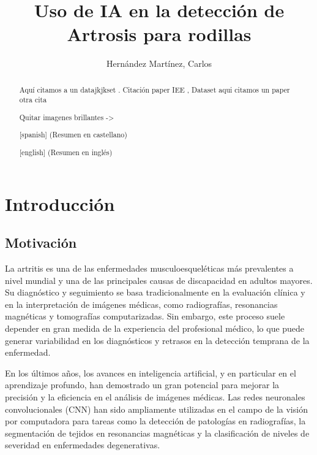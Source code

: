 \documentclass[11pt,spanish,listoffigures,listoftables]{tfgetsinf}
\title{Uso de IA en la detección de Artrosis para rodillas}
\author{Hernández Martínez, Carlos}
\begin{document}

\begin{abstract}
Aquí citamos a un datajkjkset \cite{gornale2020digital}.
Citación paper IEE \cite{10863523}, Dataset \cite{chen2018knee}
aqui citamos un paper \cite{VAATTOVAARA2025100580}
otra cita \cite{comprehensive_review}

Quitar imagenes brillantes -> \cite{efficientnet_paper}
\end{abstract}

\begin{abstract}[spanish]
(Resumen en castellano)
\end{abstract}

\begin{abstract}[english]
(Resumen en inglés)
\end{abstract}

\mainmatter


\chapter{Introducción}  %

\section{Motivación}     %
La artritis es una de las enfermedades musculoesqueléticas más prevalentes a nivel mundial y una de las principales causas de discapacidad en adultos mayores. Su diagnóstico y seguimiento se basa tradicionalmente en la evaluación clínica y en la interpretación de imágenes médicas, como radiografías, resonancias magnéticas y tomografías computarizadas. Sin embargo, este proceso suele depender en gran medida de la experiencia del profesional médico, lo que puede generar variabilidad en los diagnósticos y retrasos en la detección temprana de la enfermedad.

En los últimos años, los avances en inteligencia artificial, y en particular en el aprendizaje profundo, han demostrado un gran potencial para mejorar la precisión y la eficiencia en el análisis de imágenes médicas. Las redes neuronales convolucionales (CNN) han sido ampliamente utilizadas en el campo de la visión por computadora para tareas como la detección de patologías en radiografías, la segmentación de tejidos en resonancias magnéticas y la clasificación de niveles de severidad en enfermedades degenerativas.
\end{document}
